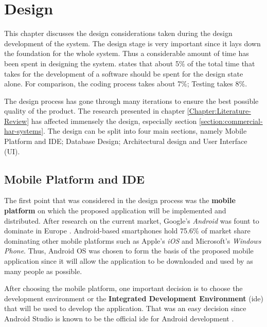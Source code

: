 \chapter{Design}
\label{Chapter:Design}

This chapter discusses the design considerations taken during the design development of the system. The design stage is very important since it lays down the foundation for the whole system.
Thus a considerable amount of time has been spent in designing the system. \citet[12]{bell2005} states that about 5\% of the total time that takes for the development of a software should be spent for the design state alone. For comparison, the coding process takes about 7\%; Testing takes 8\%. 

The design process has gone through many iterations to ensure the best possible quality of the product. The research presented in chapter \ref{Chapter:Literature-Review} has affected immensely the design, especially section \ref{section:commercial-har-systems}. The design can be split into four main sections, namely Mobile Platform and IDE; Database Design; Architectural design and User Interface (UI).

    \section{Mobile Platform and IDE}
        The first point that was considered in the design process was the \textbf{mobile platform} on which the proposed application will be implemented and distributed. After research on the current market, Google's \textit{Android} was fount to dominate in Europe \citep{williams2016}. Android-based smartphones hold 75.6\% of market share dominating other mobile platforms such as Apple's \textit{iOS} and Microsoft's \textit{Windows Phone}. Thus, Android OS was chosen to form the basis of the proposed mobile application since it will allow the application to be downloaded and used by as many people as possible.
        
        After choosing the mobile platform, one important decision is to choose the development environment or the \textbf{Integrated Development Environment} (\gls{ide}) that will be used to develop the application. That was an easy decision since Android Studio is known to be the official \gls{ide} for Android development \citep{androidstudio2017}.
        
